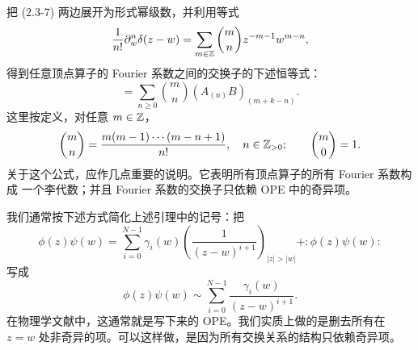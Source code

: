 把 (2.3-7) 两边展开为形式幂级数，并利用等式
\[
    \frac{1}{n!}\partial_w^n\delta(z-w)
    =\sum_{m\in\mathbb{Z}}\binom{m}{n}z^{-m-1}w^{m-n},
\]
得到任意顶点算子的 Fourier 系数之间的交换子的下述恒等式：
\begin{equation}
    [A_{(m)},B_{(k)}]=\sum_{n\ge0}\binom{m}{n}
    (A_{(n)}B)_{(m+k-n)}.
    \tag{2.3-8}
\end{equation}
这里按定义，对任意 $m\in\mathbb{Z}$，
\[
    \binom{m}{n}=\frac{m(m-1)\cdots(m-n+1)}{n!},\quad n\in\mathbb{Z}_{>0};
    \qquad\binom{m}{0}=1.
\]
关于这个公式，应作几点重要的说明。它表明所有顶点算子的所有 Fourier 系数构成
一个李代数；并且 Fourier 系数的交换子只依赖 OPE 中的奇异项。

我们通常按下述方式简化上述引理中的记号：把
\[
    \phi(z)\psi(w)=\sum_{i=0}^{N-1}\gamma_i(w)
    \left(\frac{1}{(z-w)^{i+1}}\right)_{|z|>|w|}
    +:\!\phi(z)\psi(w)\!:
\]
写成
\[
    \phi(z)\psi(w)\sim\sum_{i=0}^{N-1}
    \frac{\gamma_i(w)}{(z-w)^{i+1}}.
\]
在物理学文献中，这通常就是写下来的 OPE。我们实质上做的是删去所有在 $z=w$
处非奇异的项。可以这样做，是因为所有交换关系的结构只依赖奇异项。

\endgroup

